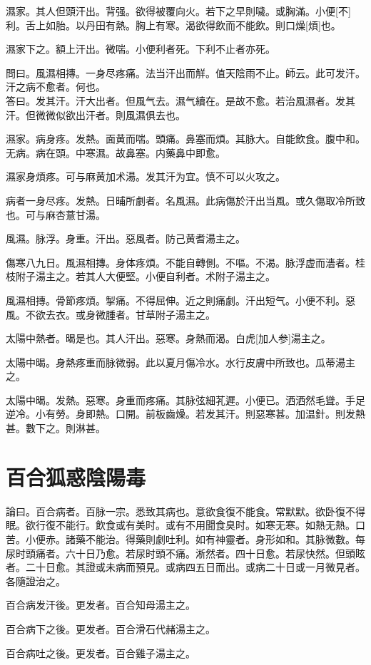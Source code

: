 \documentclass[12pt,oneside,UTF8,b5paper]{ctexbook}她她她她她她她
\begin{document}
濕家。其人但頭汗出。背强。欲得被覆向火。若下之早則噦。或胸滿。小便[不]利。舌上如胎。以丹田有熱。胸上有寒。渴欲得飲而不能飲。則口燥[煩]也。

濕家下之。額上汗出。微喘。小便利者死。下利不止者亦死。

問曰。風濕相摶。一身尽疼痛。法当汗出而觧。值天陰雨不止。師云。此可发汗。汗之病不愈者。何也。\\
答曰。发其汗。汗大出者。但風气去。濕气續在。是故不愈。若治風濕者。发其汗。但微微似欲出汗者。則風濕俱去也。

濕家。病身疼。发熱。面黄而喘。頭痛。鼻塞而煩。其脉大。自能飲食。腹中和。无病。病在頭。中寒濕。故鼻塞。内藥鼻中即愈。

濕家身煩疼。可与麻黄加术湯。发其汗为宜。慎不可以火攻之。

病者一身尽疼。发熱。日晡所劇者。名風濕。此病傷於汗出当風。或久傷取冷所致也。可与麻杏薏甘湯。

風濕。脉浮。身重。汗出。惡風者。防己黄耆湯主之。

傷寒八九日。風濕相摶。身体疼煩。不能自轉側。不嘔。不渴。脉浮虚而濇者。桂枝附子湯主之。若其人大便堅。小便自利者。术附子湯主之。

風濕相摶。骨節疼煩。掣痛。不得屈伸。近之則痛劇。汗出短气。小便不利。惡風。不欲去衣。或身微腫者。甘草附子湯主之。

太陽中熱者。暍是也。其人汗出。惡寒。身熱而渴。白虎[加人参]湯主之。

太陽中暍。身熱疼重而脉微弱。此以夏月傷冷水。水行皮膚中所致也。瓜蒂湯主之。

太陽中暍。发熱。惡寒。身重而疼痛。其脉弦細芤遲。小便已。洒洒然毛聳。手足逆冷。小有勞。身即熱。口開。前板齒燥。若发其汗。則惡寒甚。加温針。則发熱甚。數下之。則淋甚。

\chapter{百合狐惑陰陽毒}

論曰。百合病者。百脉一宗。悉致其病也。意欲食復不能食。常默默。欲卧復不得眠。欲行復不能行。飲食或有美时。或有不用聞食臭时。如寒无寒。如熱无熱。口苦。小便赤。諸藥不能治。得藥則劇吐利。如有神靈者。身形如和。其脉微數。每尿时頭痛者。六十日乃愈。若尿时頭不痛。淅然者。四十日愈。若尿快然。但頭眩者。二十日愈。其證或未病而預見。或病四五日而出。或病二十日或一月微見者。各隨證治之。

百合病发汗後。更发者。百合知母湯主之。

百合病下之後。更发者。百合滑石代赭湯主之。

百合病吐之後。更发者。百合雞子湯主之。
\end{document}
